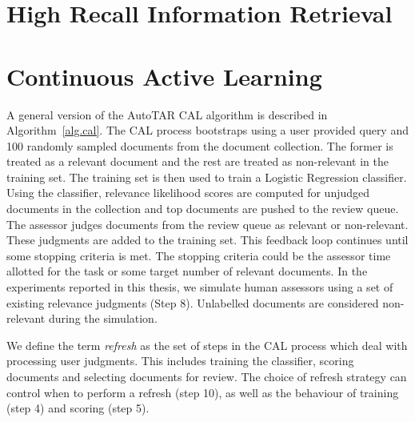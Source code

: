 \label{chap:rel}


\section{High Recall Information Retrieval}


\section{Continuous Active Learning}
\label{sec:cal}

A general version of the AutoTAR CAL algorithm is described in
Algorithm~\ref{alg.cal}. The CAL process bootstraps using a user provided query
and 100 randomly sampled documents from the document collection. The former is
treated as a relevant document and the rest are treated as non-relevant in the
training set. The training set is then used to train a Logistic Regression
classifier. Using the classifier, relevance likelihood scores are computed
for unjudged documents in the collection and top documents are pushed to
the review queue. The assessor judges documents from the review queue as
relevant or non-relevant. These judgments are added to the training set. This
feedback loop continues until some stopping criteria is met. The stopping
criteria could be the assessor time allotted for the task or some target number of
relevant documents. In the experiments reported in this thesis, we simulate
human assessors using a set of existing relevance judgments (Step 8). Unlabelled
documents are considered non-relevant during the simulation.

We define the term \textit{refresh} as the set of steps in the CAL process which
deal with processing user judgments. This includes training the classifier,
scoring documents and selecting documents for review. The choice of refresh
strategy can control when to perform a refresh (step 10), as well as the
behaviour of training (step 4) and scoring (step 5). 


